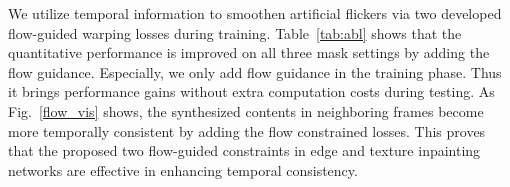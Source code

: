 We utilize temporal information to smoothen artificial flickers via two developed flow-guided warping losses during training. 
Table~\ref{tab:abl} shows that the quantitative performance is improved on all three mask settings by adding the flow guidance. Especially, we only add flow guidance in the training phase. 
Thus it brings performance gains without extra computation costs during testing.
%
As Fig.~\ref{flow_vis} shows, the synthesized contents in neighboring frames become more temporally consistent by adding the flow constrained losses.
This proves that the proposed two flow-guided constraints in edge and texture inpainting networks are effective in enhancing temporal consistency.



